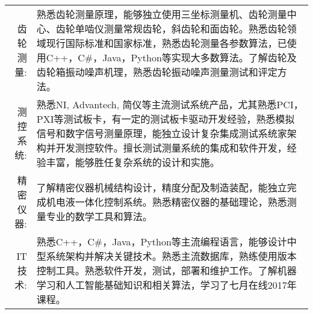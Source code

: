 %
%


 
\renewcommand{\arraystretch}{1.5}

	\begin{tabular}{>{}r>{}p{15cm}} 
		\textsc{齿轮测量:}      &  熟悉齿轮测量原理，能够独立使用三坐标测量机、齿轮测量中心、齿轮单啮仪测量常规齿轮，斜齿轮和面齿轮。熟悉齿轮领域现行国际标准和国家标准，熟悉齿轮测量各参数算法，已使用C++，C\#，Java，Python等实现大多数算法。了解齿轮及齿轮箱振动噪声机理，熟悉齿轮振动噪声测量测试和评定方法。\\  
		\textsc{测控系统:} 		&  熟悉NI, Advantech, 简仪等主流测试系统产品，尤其熟悉PCI，PXI等测试板卡，有一定的测试板卡驱动开发经验，熟悉模拟信号和数字信号测量原理，能独立设计复杂集成测试系统家架构并开发测控软件。擅长测试测量系统的集成和软件开发，经验丰富，能够胜任复杂系统的设计和实施。 \\
							  
		\textsc{精密仪器:}	   &  了解精密仪器机械结构设计，精度分配及制造装配，能独立完成机电液一体化控制系统。熟悉精密仪器的基础理论，熟悉测量专业的数学工具和算法。  \\
		\textsc{IT技术:}	    &  熟悉C++，C\#，Java，Python等主流编程语言，能够设计中型系统架构并解决关键技术。熟悉主流数据库，熟练使用版本控制工具。熟悉软件开发，测试，部署和维护工作。了解机器学习和人工智能基础知识和相关算法，学习了七月在线2017年课程。\\
	\end{tabular}
	
